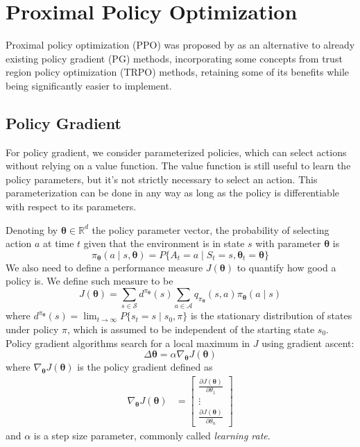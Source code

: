\chapter{Proximal Policy Optimization}
Proximal policy optimization (PPO) was proposed by \cite{https://doi.org/10.48550/arxiv.1707.06347} as an alternative to already existing policy gradient (PG) methods, incorporating some concepts from trust region policy optimization (TRPO) methods, retaining some of its benefits while being significantly easier to implement.
\section{Policy Gradient}
For policy gradient, we consider parameterized policies, which can select actions without relying on a value function. The value function is still useful to learn the policy parameters, but it's not strictly necessary to select an action. This parameterization can be done in any way as long as the policy is differentiable with respect to its parameters.

Denoting by $\boldsymbol\theta \in \mathbb{R}^d$ the policy parameter vector, the probability of selecting action $a$ at time $t$ given that the environment is in state $s$ with parameter $\boldsymbol\theta$ is
\[
    \pi_{\boldsymbol\theta}(a \mid s, \boldsymbol\theta) = P\{A_t = a \mid S_t = s, \boldsymbol\theta_t = \boldsymbol\theta\}   
\]
We also need to define a performance measure $J(\boldsymbol\theta)$ to quantify how good a policy is. We define such measure to be
\begin{equation}
    J(\boldsymbol\theta) = \sum_{s \in \mathcal{S}} d^{\pi_{\boldsymbol\theta}}(s) \sum_{a \in \mathcal{A}} q_{\pi_{\boldsymbol\theta}}(s, a) \pi_{\boldsymbol\theta}(a \mid s)
\end{equation} 
where $d^{\pi_{\boldsymbol\theta}}(s) = \lim_{t \to \infty} P\{s_t = s \mid s_0, \pi\}$ is the stationary distribution of states under policy $\pi$, which is assumed to be independent of the starting state $s_0$. Policy gradient algorithms search for a local maximum in $J$ using gradient ascent:
\[
    \Delta\boldsymbol\theta = \alpha\nabla_{\boldsymbol\theta}J(\boldsymbol\theta)   
\]
where $\nabla_{\boldsymbol\theta}J(\boldsymbol\theta)$ is the policy gradient defined as
\begin{align*}
    \nabla_{\boldsymbol\theta}J(\boldsymbol\theta) &=
    \begin{bmatrix}
        \frac{\partial J(\boldsymbol\theta)}{\partial \theta_1} \\
        \vdots \\
        \frac{\partial J(\boldsymbol\theta)}{\partial \theta_n}
    \end{bmatrix}
\end{align*} 
and $\alpha$ is a step size parameter, commonly called \textit{learning rate}.

